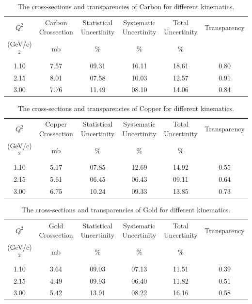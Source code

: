 \documentclass[aps,11pt]{revtex4}
\begin{document}
\begin{table}[!ht] 
\begin{tabular}{||c|c|c|c|c|c||}\hline
 $Q^2$ & Carbon Crossection & Statistical Uncertinity & Systematic Uncertinity & Total Uncertinity & Transparency \\
 (GeV/c)$^2$ & mb & $\%$ & $\%$ & $\%$ &  \\\hline
1.10 &7.57 &09.31 &16.11 &18.61 &0.80 \\
2.15 &8.01 &07.58 &10.03 &12.57 &0.91 \\
3.00 &7.76 &11.49 &08.10 &14.06 &0.84 \\\hline      
\end{tabular}
\caption{\label{table1} The cross-sections and transparencies of Carbon for different kinematics.}\label{tab:c}
\vspace{-0.5cm}
\end{table}

\begin{table}[!ht] 
\begin{tabular}{||c|c|c|c|c|c||}\hline
 $Q^2$ & Copper Crossection & Statistical Uncertinity & Systematic Uncertinity & Total Uncertinity & Transparency \\
 (GeV/c)$^2$ & mb & $\%$ & $\%$ & $\%$ &  \\\hline
1.10 &5.17 &07.85 &12.69 &14.92 &0.55 \\
2.15 &5.61 &06.45 &06.43 &09.11 &0.64 \\
3.00 &6.75 &10.24 &09.33 &13.85 &0.73 \\\hline      
\end{tabular}
\caption{\label{table1} The cross-sections and transparencies of Copper for different kinematics.}\label{tab:cu}
\vspace{-0.5cm}
\end{table}

\begin{table}[!ht]
\begin{tabular}{||c|c|c|c|c|c||}\hline
 $Q^2$ & Gold Crossection & Statistical Uncertinity & Systematic Uncertinity & Total Uncertinity & Transparency \\
 (GeV/c)$^2$ & mb & $\%$ & $\%$ & $\%$ &  \\\hline
1.10 &3.64 &09.03 &07.13 &11.51 &0.39 \\
2.15 &4.49 &09.93 &06.40 &11.82 &0.51 \\
3.00 &5.42 &13.91 &08.22 &16.16 &0.58 \\\hline      
\end{tabular}
\caption{\label{table1} The cross-sections and transparencies of Gold for different kinematics.}\label{tab:g}
\vspace{-0.5cm}
\end{table}
\end{document}
